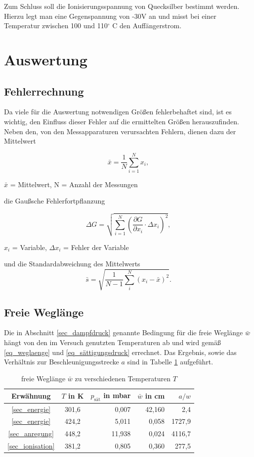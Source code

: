 Zum Schluss soll die Ionisierungsspannung von Quecksilber bestimmt werden. Hierzu legt man eine Gegenspannung von -30V an und misst bei einer Temperatur zwischen 100 und 110$^\circ$ C den Auffängerstrom.

\section{Auswertung}
\subsection{Fehlerrechnung}
Da viele für die Auswertung notwendigen Größen fehlerbehaftet sind, ist es wichtig, den Einfluss dieser Fehler auf die ermittelten
Größen herauszufinden. Neben den, von den Messapparaturen verursachten Fehlern, dienen dazu der Mittelwert
\begin{formel}[H]
\begin{equation}
 \bar{x} = \frac1N \sum_{i=1}^{N} x_i,
 \label{eq_mittel}
\end{equation}
\caption*{\small{$\bar{x}$ = Mittelwert, N = Anzahl der Messungen}}
\end{formel}
die Gaußsche Fehlerfortpflanzung
\begin{formel}[H]
\begin{equation}
\Delta G = \sqrt{\sum_{i=1}^{N}\left( \frac{\partial G}{\partial x_i}\cdot \Delta x_i\right)^2},
\label{gauss}
\end{equation}
\caption*{$x_i$ = Variable, $\Delta x_i$ = Fehler der Variable}
\end{formel}
und die Standardabweichung des Mittelwerts
\begin{equation}
 \bar s = \sqrt{\frac{1}{N-1} \sum_{i}^{N} (x_i - \bar{x})^2}.
 \label{eq_standard}
\end{equation}

\subsection{Freie Weglänge}
Die in Abschnitt \ref{sec_dampfdruck} genannte Bedingung für die freie Weglänge $\bar w$ hängt von den im Versuch genutzten Temperaturen
ab und wird gemäß \eqref{eq_weglaenge} und \eqref{eq_sättigungsdruck} errechnet. Das Ergebnis, sowie das Verhältnis zur Beschleunigungsstrecke $a$ sind in Tabelle 
\ref{tab_weglaenge} aufgeführt.

\begin{table}[H]
 \begin{tabular}{c|c|r|r|r}
  Erwähnung	&$T$ in K	&$p_{\text{sät}}$ in mbar&$\bar w$ in cm	&$a/w$ \\
  \hline
\ref{sec_energie}&	301,6	&0,007&	42,160&	2,4\\
\ref{sec_energie}&	424,2&	5,011	&0,058&	1727,9\\
\ref{sec_anregung}&	448,2&	11,938&	0,024&	4116,7\\
\ref{sec_ionisation}&	381,2&	0,805&	0,360&	277,5
 \end{tabular}
\caption{freie Weglänge $\bar w$ zu verschiedenen Temperaturen $T$}
\label{tab_weglaenge}
\end{table}

